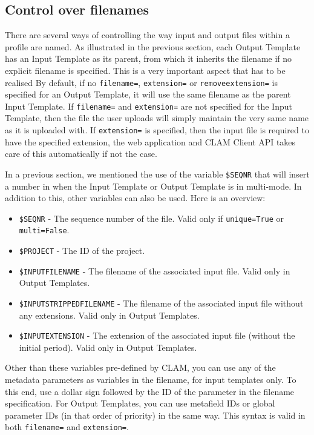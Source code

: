 \documentclass[a4paper,12pt]{report}
\begin{document}
\subsection{Control over filenames}
\label{sec:filenamevariables}

There are several ways of controlling the way input and output files within a
profile are named. As illustrated in the previous section, each Output Template
has an Input Template as its parent, from which it inherits the filename if no
explicit filename is specified. This is a very important aspect that has to be
realised By default, if no \texttt{filename=}, \texttt{extension=} or
\texttt{removeextension=} is specified for an Output Template, it will use the
same filename as the parent Input Template. If \texttt{filename=} and
\texttt{extension=} are not specified for the Input Template, then the file the
user uploads will simply maintain the very same name as it is uploaded with. If
\texttt{extension=} is specified, then the input file is required to have the
specified extension, the web application and CLAM Client API takes care of this
automatically if not the case.

In a previous section, we mentioned the use of the variable \texttt{\$SEQNR}
that will insert a number in when the Input Template or Output Template is in
multi-mode. In addition to this, other variables can also be used. Here is an
overview:

\begin{itemize}
\item \texttt{\$SEQNR} - The sequence number of the file. Valid only if \texttt{unique=True} or \texttt{multi=False}.
\item \texttt{\$PROJECT} - The ID of the project.
\item \texttt{\$INPUTFILENAME} - The filename of the associated input file. Valid only in Output Templates.
\item \texttt{\$INPUTSTRIPPEDFILENAME} - The filename of the associated input file without any extensions. Valid only in Output Templates.
\item \texttt{\$INPUTEXTENSION} - The extension of the associated input file (without the initial period). Valid only in Output Templates.
\end{itemize} 

Other than these variables pre-defined by CLAM, you can use
any of the metadata parameters as variables in the filename, for input
templates only. To this end, use a
dollar sign followed by the ID of the parameter in the filename specification.
For Output Templates, you can use metafield IDs or global parameter IDs (in
that order of priority) in the same way. This syntax is valid in both
\texttt{filename=} and \texttt{extension=}.
\end{document}
